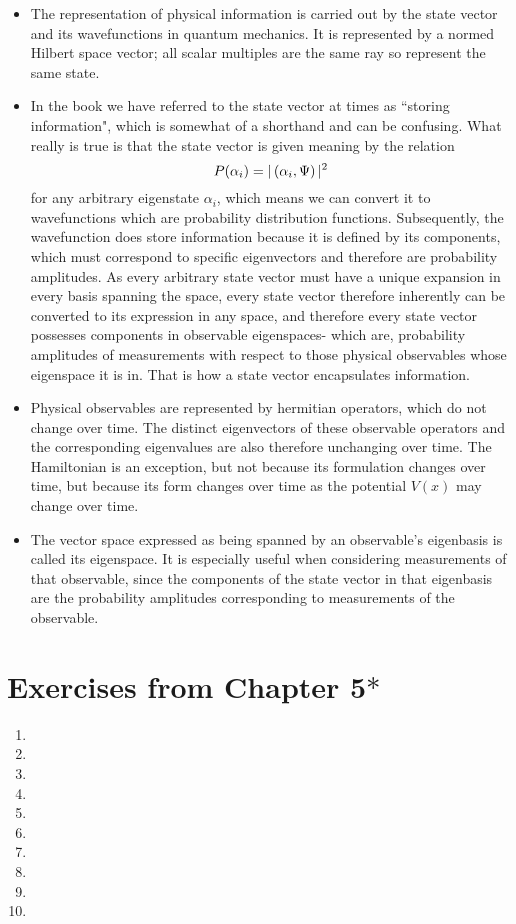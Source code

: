 \begin{itemize}
    \item The representation of physical information is carried out by the state vector and its wavefunctions in quantum mechanics. It is represented by a normed Hilbert space vector; all scalar multiples are the same ray so represent the same state.
    \item In the book we have referred to the state vector at times as ``storing information", which is somewhat of a shorthand and can be confusing. What really is true is that the state vector is given meaning by the relation
    $$
    P(\alpha_{i})=|\left(\alpha_{i},\Psi\right)|^{2}
    $$
    for any arbitrary eigenstate $\alpha_{i}$, which means we can convert it to wavefunctions which are probability distribution functions. Subsequently, the wavefunction does store information because it is defined by its components, which must correspond to specific eigenvectors and therefore are probability amplitudes. As every arbitrary state vector must have a unique expansion in every basis spanning the space, every state vector therefore inherently can be converted to its expression in any space, and therefore every state vector possesses components in observable eigenspaces- which are, probability amplitudes of measurements with respect to those physical observables whose eigenspace it is in. That is how a state vector encapsulates information.
    \item Physical observables are represented by hermitian operators, which do not change over time. The distinct eigenvectors of these observable operators and the corresponding eigenvalues are also therefore unchanging over time. The Hamiltonian is an exception, but not because its formulation changes over time, but because its form changes over time as the potential $V(x)$ may change over time.
    \item The vector space expressed as being spanned by an observable's eigenbasis is called its eigenspace. It is especially useful when considering measurements of that observable, since the components of the state vector in that eigenbasis are the probability amplitudes corresponding to measurements of the observable.
\end{itemize}
\section{Exercises from Chapter 5$\ast$}
\begin{enumerate}
    \item 
    \item
    \item
    \item
    \item
    \item
    \item
    \item
    \item
    \item
\end{enumerate}
